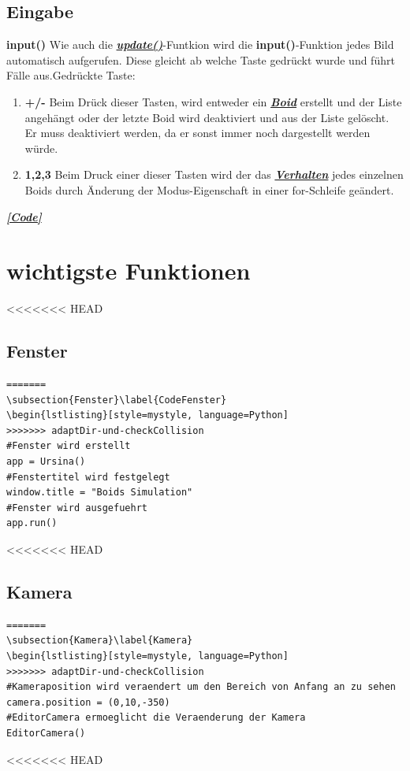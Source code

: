\documentclass[a4paper, hidelinks, 12pt]{article}
\begin{document}
\subsection{Eingabe}
\textbf{input()}\label{sec:input}
Wie auch die \hyperref[sec:update]{\textbf{\emph{update()}}}-Funtkion\cite{update} wird die \textbf{input()}-Funktion jedes Bild automatisch aufgerufen. Diese gleicht ab welche Taste gedrückt wurde und führt Fälle aus\cite{input}.\newline Gedrückte Taste: 

\begin{enumerate}
\item \textbf{+/-} Beim Drück dieser Tasten, wird entweder ein \hyperref[sec:Boid]{\textbf{\emph{Boid}}} erstellt und der Liste angehängt oder der letzte Boid wird deaktiviert und aus der Liste gelöscht. Er muss deaktiviert werden, da er sonst immer noch dargestellt werden würde.
\item \textbf{1,2,3} Beim Druck einer dieser Tasten wird der das \hyperref[sec:Verhalten]{\textbf{\emph{Verhalten}}} jedes einzelnen Boids durch Änderung der Modus-Eigenschaft in einer for-Schleife geändert.
	
\end{enumerate}
\hyperref[Codeinput]{\textbf{\emph{[Code]}}}


\newpage
\section{wichtigste Funktionen}
<<<<<<< HEAD
\subsection{Fenster}
\begin{lstlisting}[style=mystyle]
=======
\subsection{Fenster}\label{CodeFenster}
\begin{lstlisting}[style=mystyle, language=Python]
>>>>>>> adaptDir-und-checkCollision
#Fenster wird erstellt
app = Ursina()
#Fenstertitel wird festgelegt
window.title = "Boids Simulation"
#Fenster wird ausgefuehrt
app.run()
\end{lstlisting}
<<<<<<< HEAD
\subsection{Kamera}
\begin{lstlisting}[style=mystyle]
=======
\subsection{Kamera}\label{Kamera}
\begin{lstlisting}[style=mystyle, language=Python]
>>>>>>> adaptDir-und-checkCollision
#Kameraposition wird veraendert um den Bereich von Anfang an zu sehen
camera.position = (0,10,-350)
#EditorCamera ermoeglicht die Veraenderung der Kamera
EditorCamera()
\end{lstlisting}
<<<<<<< HEAD
\end{document}
